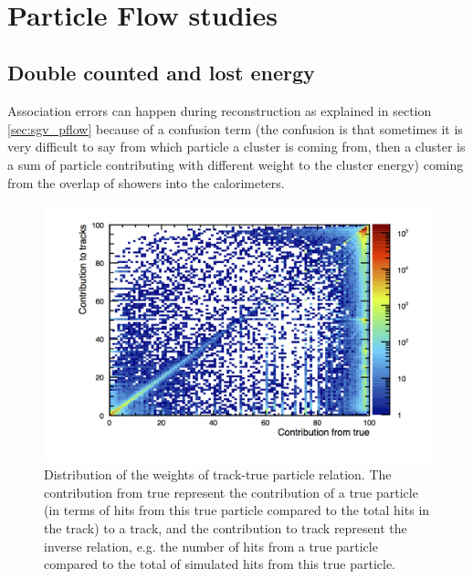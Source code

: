\documentclass[a4paper,12pt]{article}
\begin{document}
\begin{minipage}{\linewidth}
\begin{minipage}{0.4\linewidth}
\begin{figure}[H]
\end{figure}
\end{minipage}
   \label{fig:correlation_distrib}
\end{minipage}\\[0.5cm]

\section{Particle Flow studies}

\subsection{Double counted and lost energy}

Association errors can happen during reconstruction as explained in section \ref{sec:sgv_pflow} because of a confusion term (the confusion is that sometimes it is very difficult to say from which particle a cluster is coming from, then a cluster is a sum of particle contributing with different weight to the cluster energy) coming from the overlap of showers into the calorimeters. 

\begin{figure}[!h]
   \centering
   \includegraphics[scale=0.5]{weight_corr.png} 
      \caption{Distribution of the weights of track-true particle relation. The contribution from true represent the contribution of a true particle (in terms of hits from this true particle compared to the total hits in the track) to a track, and the contribution to track represent the inverse relation, e.g. the number of hits from a true particle compared to the total of simulated hits from this true particle.}
   \label{fig:weight}
\end{figure}
\end{document}
